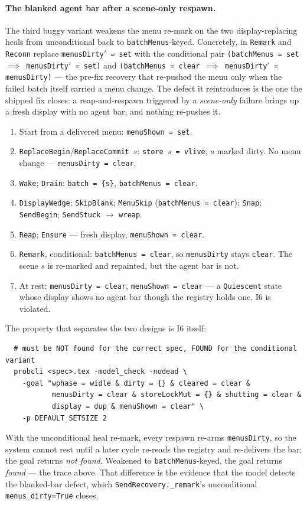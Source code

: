 \documentclass[a4paper,10pt,fleqn]{article}
\begin{document}
\paragraph{The blanked agent bar after a scene-only respawn.}
The third buggy variant weakens the menu re-mark on the two display-replacing
heals from unconditional back to \texttt{batchMenus}-keyed.  Concretely, in
\texttt{Remark} and \texttt{Reconn} replace \texttt{menusDirty$'$ = set} with
the conditional pair
\texttt{(batchMenus = set $\implies$ menusDirty$'$ = set)} and
\texttt{(batchMenus = clear $\implies$ menusDirty$'$ = menusDirty)} --- the
pre-fix recovery that re-pushed the menu only when the failed batch itself
carried a menu change.  The defect it reintroduces is the one the shipped fix
closes: a reap-and-respawn triggered by a \emph{scene-only} failure brings up a
fresh display with no agent bar, and nothing re-pushes it.

\begin{enumerate}
  \item Start from a delivered menu: \texttt{menuShown = set}.
  \item \texttt{ReplaceBegin}/\texttt{ReplaceCommit}~$s$: \texttt{store~$s$ =
    vlive}, $s$ marked dirty.  No menu change --- \texttt{menusDirty = clear}.
  \item \texttt{Wake}; \texttt{Drain}: \texttt{batch = \{s\}},
    \texttt{batchMenus = clear}.
  \item \texttt{DisplayWedge}; \texttt{SkipBlank}; \texttt{MenuSkip}
    (\texttt{batchMenus = clear}); \texttt{Snap}; \texttt{SendBegin};
    \texttt{SendStuck} $\to$ \texttt{wreap}.
  \item \texttt{Reap}; \texttt{Ensure} --- fresh display, \texttt{menuShown =
    clear}.
  \item \texttt{Remark}, conditional: \texttt{batchMenus = clear}, so
    \texttt{menusDirty} stays \texttt{clear}.  The scene $s$ is re-marked and
    repainted, but the agent bar is not.
  \item At rest: \texttt{menusDirty = clear}, \texttt{menuShown = clear} ---
    a \texttt{Quiescent} state whose display shows no agent bar though the
    registry holds one.  I6 is violated.
\end{enumerate}

The property that separates the two designs is I6 itself:
\begin{verbatim}
  # must be NOT found for the correct spec, FOUND for the conditional variant
  probcli <spec>.tex -model_check -nodead \
    -goal "wphase = widle & dirty = {} & cleared = clear &
           menusDirty = clear & storeLockMut = {} & shutting = clear &
           display = dup & menuShown = clear" \
    -p DEFAULT_SETSIZE 2
\end{verbatim}
With the unconditional heal re-mark, every respawn re-arms \texttt{menusDirty},
so the system cannot rest until a later cycle re-reads the registry and
re-delivers the bar; the goal returns \emph{not found}.  Weakened to
\texttt{batchMenus}-keyed, the goal returns \emph{found} --- the trace above.
That difference is the evidence that the model detects the blanked-bar defect,
which \texttt{SendRecovery.\_remark}'s unconditional \texttt{menus\_dirty=True}
closes.
\end{document}
